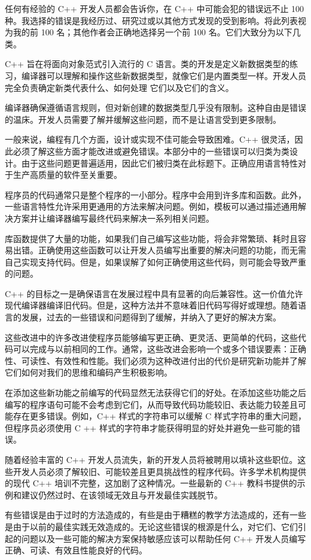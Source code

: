 
任何有经验的 C++ 开发人员都会告诉你，在 C++ 中可能会犯的错误远不止 100 种。我选择的错误是我经历过、研究过或以其他方式发现的受到影响。将此列表视为我的前 100 名；其他作者会正确地选择另一个前 100 名。它们大致分为以下几类。


C++ 旨在将面向对象范式引入流行的 C 语言。类的开发是定义新数据类型的练习，编译器可以理解和操作这些新数据类型，就像它们是内置类型一样。开发人员完全负责确定新类代表什么、如何处理 它们以及它们的含义。

编译器确保遵循语言规则，但对新创建的数据类型几乎没有限制。这种自由是错误的温床。开发人员需要了解并缓解这些问题，而不是让语言受到更多限制。


一般来说，编程有几个方面，设计或实现不佳可能会导致困难。C++ 很灵活，因此必须了解这些方面才能改进或避免错误。本部分中的一些错误可以归类为类设计。由于这些问题更普遍适用，因此它们被归类在此标题下。正确应用语言特性对于生产高质量的软件至关重要。


程序员的代码通常只是整个程序的一小部分。程序中会用到许多库和函数。此外，一些语言特性允许采用更通用的方法来解决问题。例如，模板可以通过描述通用解决方案并让编译器编写最终代码来解决一系列相关问题。

库函数提供了大量的功能，如果我们自己编写这些功能，将会非常繁琐、耗时且容易出错。正确使用这些函数可以让开发人员编写出重要的解决问题的功能，而无需自己实现支持代码。但是，如果误解了如何正确使用这些代码，则可能会导致严重的问题。


C++ 的目标之一是确保语言在发展过程中具有显著的向后兼容性。这一价值允许现代编译器编译旧代码。但是，这种方法并不意味着旧代码写得好或理想。随着语言的发展，过去的一些错误和问题得到了缓解，并纳入了更好的解决方案。

这些改进中的许多改进使程序员能够编写更正确、更灵活、更简单的代码，这些代码可以完成与以前相同的工作。通常，这些改进会影响一个或多个错误要素：正确性、可读性、有效性和性能。我们必须为这种改进付出的代价是研究新功能并了解它们如何对我们的思维和编码产生积极影响。


在添加这些新功能之前编写的代码显然无法获得它们的好处。在添加这些功能之后编写的程序语句可能不会考虑到它们，从而导致代码功能较旧、表达能力较差且可能存在更多错误。例如，C++ 样式的字符串可以缓解 C 样式字符串的重大问题，但程序员必须使用 C ++ 样式的字符串才能获得明显的好处并避免一些可能的错误。


随着经验丰富的 C++ 开发人员流失，新的开发人员将被聘用以填补这些职位。这些开发人员必须了解较旧、可能较差且更具挑战性的程序代码。许多学术机构提供的现代 C++ 培训不完整，这加剧了这种情况。一些最新的 C++ 教科书提供的示例和建议仍然过时、在该领域无效且与开发最佳实践脱节。

有些错误是由于过时的方法造成的，有些是由于糟糕的教学方法造成的，还有一些是由于以前的最佳实践无效造成的。无论这些错误的根源是什么，对它们、它们引起的问题以及一些可能的解决方案保持敏感应该可以帮助任何 C++ 开发人员编写正确、可读、有效且性能良好的代码。
